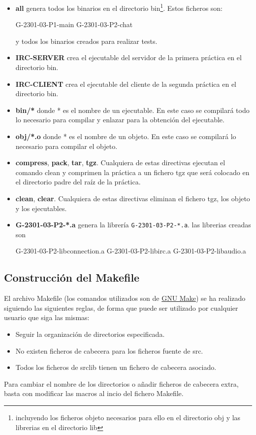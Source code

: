 \documentclass{mathnotes}
\begin{document}
\begin{itemize}
\item \textbf{all} genera todos los binarios en el directorio bin\footnote{incluyendo los ficheros objeto necesarios para ello en el directorio obj y las librerias en el directorio lib}. Estos ficheros son:

\subitem G-2301-03-P1-main
\subitem G-2301-03-P2-chat

y todos los binarios creados para realizar tests.

\item \textbf{IRC-SERVER} crea el ejecutable del servidor de la primera práctica en el directorio bin.

\item \textbf{IRC-CLIENT} crea el ejecutable del cliente de la segunda práctica en el directorio bin.

\item \textbf{bin/*} donde * es el nombre de un ejecutable. En este caso se compilará todo lo necesario para compilar y enlazar para la obtención del ejecutable.

\item \textbf{obj/*.o} donde * es el nombre de un objeto. En este caso se compilará lo necesario para compilar el objeto.

\item \textbf{compress}, \textbf{pack}, \textbf{tar}, \textbf{tgz}. Cualquiera de estas directivas ejecutan el comando clean y comprimen la práctica a un fichero tgz que será colocado en el directorio padre del raíz de la práctica.

\item \textbf{clean}, \textbf{clear}. Cualquiera de estas directivas eliminan el fichero tgz, los objeto y los ejecutables.

\item\textbf{G-2301-03-P2-*.a} genera la librería \texttt{G-2301-03-P2-*.a}.
las librerias creadas son

\subitem G-2301-03-P2-libconnection.a
\subitem G-2301-03-P2-libirc.a
\subitem G-2301-03-P2-libaudio.a
\end{itemize}

\subsection{Construcción del Makefile}
El archivo Makefile (los comandos utilizados son de \href{https://www.gnu.org/software/make/manual/make.html#Top}{GNU Make}) se ha realizado siguiendo las siguientes reglas, de forma que puede ser utilizado por cualquier usuario que siga las mismas:
\begin{itemize}
\item Seguir la organización de directorios especificada.
\item No existen ficheros de cabecera para los ficheros fuente de src.
\item Todos los ficheros de srclib tienen un fichero de cabecera asociado.
\end{itemize}
Para cambiar el nombre de los directorios o añadir ficheros de cabecera extra, basta con modificar las macros al incio del fichero Makefile.
\end{document}
